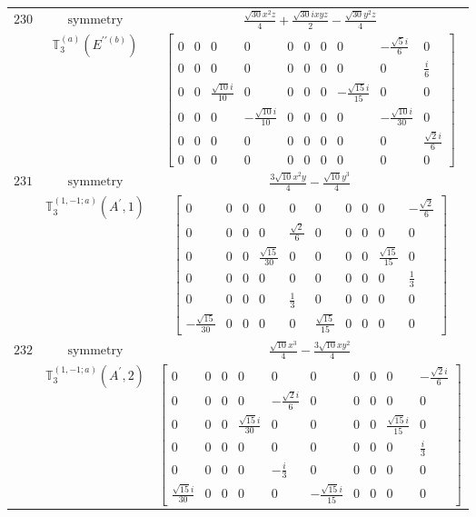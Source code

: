 \documentclass[fleqn,8pt,landscape]{jsarticle}
\begin{document}
\begin{longtable}{ccc}
$ 230 $ & $ \text{symmetry} $ & $ \frac{\sqrt{30} x^{2} z}{4} + \frac{\sqrt{30} i x y z}{2} - \frac{\sqrt{30} y^{2} z}{4} $ \\
$  $ & $ \mathbb{T}_{3}^{(a)}(E^{\prime\prime(b)}) $ & $ \begin{bmatrix} 0 & 0 & 0 & 0 & 0 & 0 & 0 & 0 & - \frac{\sqrt{5} i}{6} & 0 \\ 0 & 0 & 0 & 0 & 0 & 0 & 0 & 0 & 0 & \frac{i}{6} \\ 0 & 0 & \frac{\sqrt{10} i}{10} & 0 & 0 & 0 & 0 & - \frac{\sqrt{15} i}{15} & 0 & 0 \\ 0 & 0 & 0 & - \frac{\sqrt{10} i}{10} & 0 & 0 & 0 & 0 & - \frac{\sqrt{10} i}{30} & 0 \\ 0 & 0 & 0 & 0 & 0 & 0 & 0 & 0 & 0 & \frac{\sqrt{2} i}{6} \\ 0 & 0 & 0 & 0 & 0 & 0 & 0 & 0 & 0 & 0 \end{bmatrix} $ \\ \hline
$ 231 $ & $ \text{symmetry} $ & $ \frac{3 \sqrt{10} x^{2} y}{4} - \frac{\sqrt{10} y^{3}}{4} $ \\
$  $ & $ \mathbb{T}_{3}^{(1,-1;a)}(A^{\prime},1) $ & $ \begin{bmatrix} 0 & 0 & 0 & 0 & 0 & 0 & 0 & 0 & 0 & - \frac{\sqrt{2}}{6} \\ 0 & 0 & 0 & 0 & \frac{\sqrt{2}}{6} & 0 & 0 & 0 & 0 & 0 \\ 0 & 0 & 0 & \frac{\sqrt{15}}{30} & 0 & 0 & 0 & 0 & \frac{\sqrt{15}}{15} & 0 \\ 0 & 0 & 0 & 0 & 0 & 0 & 0 & 0 & 0 & \frac{1}{3} \\ 0 & 0 & 0 & 0 & \frac{1}{3} & 0 & 0 & 0 & 0 & 0 \\ - \frac{\sqrt{15}}{30} & 0 & 0 & 0 & 0 & \frac{\sqrt{15}}{15} & 0 & 0 & 0 & 0 \end{bmatrix} $ \\ \hline
$ 232 $ & $ \text{symmetry} $ & $ \frac{\sqrt{10} x^{3}}{4} - \frac{3 \sqrt{10} x y^{2}}{4} $ \\
$  $ & $ \mathbb{T}_{3}^{(1,-1;a)}(A^{\prime},2) $ & $ \begin{bmatrix} 0 & 0 & 0 & 0 & 0 & 0 & 0 & 0 & 0 & - \frac{\sqrt{2} i}{6} \\ 0 & 0 & 0 & 0 & - \frac{\sqrt{2} i}{6} & 0 & 0 & 0 & 0 & 0 \\ 0 & 0 & 0 & \frac{\sqrt{15} i}{30} & 0 & 0 & 0 & 0 & \frac{\sqrt{15} i}{15} & 0 \\ 0 & 0 & 0 & 0 & 0 & 0 & 0 & 0 & 0 & \frac{i}{3} \\ 0 & 0 & 0 & 0 & - \frac{i}{3} & 0 & 0 & 0 & 0 & 0 \\ \frac{\sqrt{15} i}{30} & 0 & 0 & 0 & 0 & - \frac{\sqrt{15} i}{15} & 0 & 0 & 0 & 0 \end{bmatrix} $ \\ \hline

\end{longtable}
\end{document}
